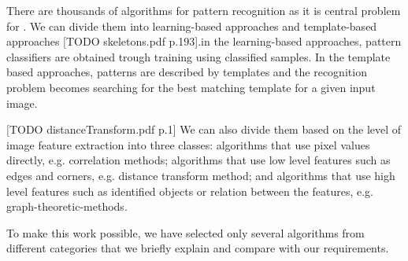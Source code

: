 There are thousands of algorithms for pattern recognition as it is central problem for . We can divide them into learning-based approaches and template-based approaches [TODO skeletons.pdf p.193].in the learning-based approaches, pattern classifiers are obtained trough training using classified samples. In the template based approaches, patterns are described by templates and the recognition problem becomes searching for the best matching template for a given input image.

[TODO distanceTransform.pdf p.1]
We can also divide them based on the level of image feature extraction into three classes: algorithms that use pixel values directly, e.g. correlation methods; algorithms that use low level features such as edges and corners, e.g. distance transform method; and algorithms that use high level features such as identified objects or relation between the features, e.g. graph-theoretic-methods. 

To make this work possible, we have selected only several algorithms from different categories that we briefly explain and compare with our requirements.



